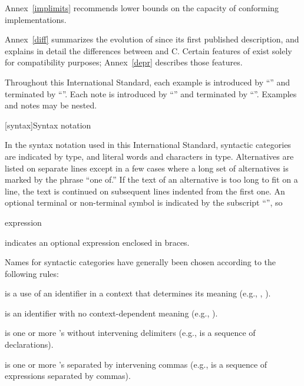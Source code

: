 \pnum
Annex~\ref{implimits} recommends lower bounds on the capacity of conforming
implementations.

\pnum
Annex~\ref{diff} summarizes the evolution of \Cpp  since its first
published description, and explains in detail the differences between
\Cpp  and C. Certain features of \Cpp  exist solely for compatibility
purposes; Annex~\ref{depr} describes those features.

\pnum
Throughout this International Standard, each example is introduced by
``\enterexample'' and terminated by ``\exitexample''. Each note is
introduced by ``\enternote'' and terminated by ``\exitnote''. Examples
and notes may be nested.%

[syntax]{Syntax notation}

\pnum
{}%
In the syntax notation used in this International Standard, syntactic
categories are indicated by  type, and literal words
and characters in   type. Alternatives are
listed on separate lines except in a few cases where a long set of
alternatives is marked by the phrase ``one of.'' If the text of an alternative is too long to fit on a line, the text is continued on subsequent lines indented from the first one.
An optional terminal or non-terminal symbol is indicated by the subscript
``\opt'', so

\begin{ncbnf}
\terminal{\{} expression\opt \terminal{\}}
\end{ncbnf}

indicates an optional expression enclosed in braces.%

\pnum
Names for syntactic categories have generally been chosen according to
the following rules:
\begin{compactitem}
\item {} is a use of an identifier in a context that
determines its meaning (e.g., ,
).
\item {} is an identifier with no context-dependent meaning
(e.g., ).
\item {} is one or more 's without intervening
delimiters (e.g.,  is a sequence of
declarations).
\item {} is one or more 's separated by
intervening commas (e.g.,  is a sequence of
expressions separated by commas).
\end{compactitem}%

